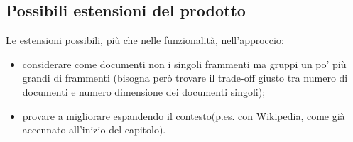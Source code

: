 \subsection{Possibili estensioni del prodotto}
Le estensioni possibili, più che nelle funzionalità, nell'approccio:
\begin{itemize}
    \item considerare come documenti non i singoli frammenti ma gruppi un po' più grandi di frammenti (bisogna però trovare il trade-off giusto tra numero di documenti e numero dimensione dei documenti singoli);
    \item provare a migliorare espandendo il contesto(p.es. con Wikipedia, come già accennato all'inizio del capitolo).
\end{itemize} 
